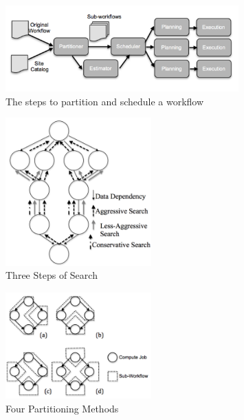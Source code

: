 \begin{figure}[lh!]
	\centering
    \includegraphics[width=0.8\textwidth]{figures/partitioning/partitioning_steps.pdf}
    \caption{The steps to partition and schedule a workflow}
    \label{fig:partitioning_steps}
\end{figure}
\begin{figure}[lh!]
	\centering
    \includegraphics[width=0.5\textwidth]{figures/partitioning/three_steps.pdf}
    \caption{Three Steps of Search}
    \label{fig:three_steps}
\end{figure}
\begin{figure}[lh!]
	\centering
    \includegraphics[width=0.5\textwidth]{figures/partitioning/four_partitioning.pdf}
    \caption{Four Partitioning Methods}
    \label{fig:four_partitioning}
\end{figure}
